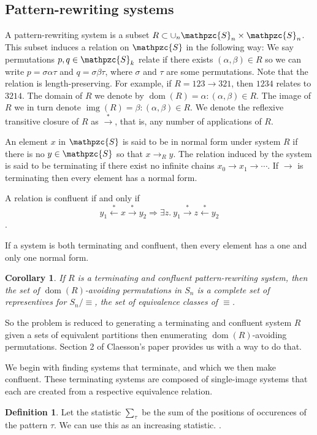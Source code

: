 \documentclass[a4paper, 11pt]{article}
\newtheorem{corollary}[theorem]{Corollary}
\theoremstyle{definition}
\newtheorem{definition}[theorem]{Definition}
\newcommand{\Sym}{\mathpzc{S}}
\newcommand{\from}{\leftarrow}
\newcommand{\tostar}{\stackrel{*}{\to}}
\newcommand{\fromstar}{\stackrel{*}{\from}}
\DeclareMathOperator{\dom}{dom}
\DeclareMathOperator{\img}{img}
\begin{document}
\subsection{Pattern-rewriting systems}
A pattern-rewriting system is a subset $R \subset \cup_n \Sym_n \times \Sym_n$. 
This subset induces a relation on $\Sym$ in the following way: We say
permutations $p, q \in \Sym_k$ relate if there exists $(\alpha,\beta) \in R$ so 
we can write $p = \sigma \alpha \tau$ and $q = \sigma \beta \tau$, where
$\sigma$ and $\tau$ are some permutations.
Note that the relation is length-preserving.
For example, if $R = {123 \to 321}$, then $1234$ relates to $3214$.
The domain of $R$ we denote by $\dom(R) = {\alpha : (\alpha, \beta) \in R}$.
The image of $R$ we in turn denote $\img(R) = {\beta : (\alpha, \beta) \in R}$.
We denote the reflexive transitive closure of $R$ as $\tostar$, that
is, any number of applications of $R$.

An element $x$ in $\Sym$ is said to be in normal form under system $R$ if there
is no $y \in \Sym$ so that $x \to_R y$. The relation induced by the system is
said to be terminating if there exist no infinite chains $x_0 \to x_1 \to
\cdots$. If $\to$ is terminating then every element has a normal form. 

A relation is confluent if and only if
$$
    y_1 \fromstar x \tostar y_2 \Longrightarrow 
    \exists z. \  y_1 \tostar z \fromstar y_2
$$.

If a system is both terminating and confluent, then every element has a one and
only one normal form.

\begin{corollary}
    If $R$ is a terminating and confluent pattern-rewriting system, then the set
    of $\dom(R)$-avoiding permutations in $S_n$ is a complete set of
    representives for $S_n / \equiv$, the set of equivalence classes of
    $\equiv$.
\end{corollary}

So the problem is reduced to generating a terminating and confluent system $R$
given a sets of equivalent partitions then enumerating $\dom(R)$-avoiding permutations.
Section 2 of Claesson's paper provides us with a way to do that. \cite{claesson}

We begin with finding systems that terminate, and which we then make confluent.
These terminating systems are composed of single-image systems that each are
created from a respective equivalence relation.

\begin{definition}
    Let the statistic $\sum_\tau$ be the sum of the positions of occurences of
    the pattern $\tau$. We can use this as an increasing statistic.
    \cite{claesson}.
\end{definition}
\end{document}
